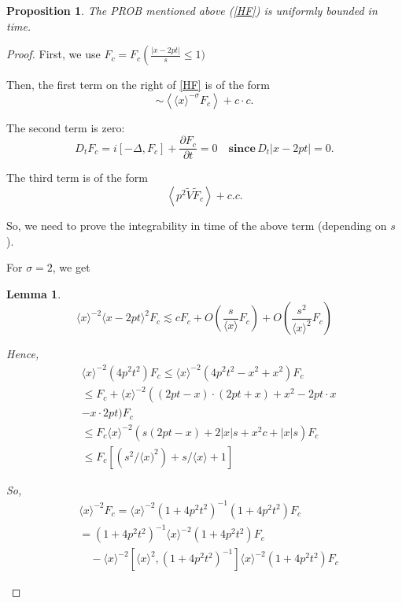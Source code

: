 \documentclass[11pt]{article}
\newtheorem{proposition}[theorem]{Proposition}
\newtheorem{lemma}[theorem]{Lemma}
\begin{document}
\begin{proposition}
 The PROB mentioned above (\eqref{HF}) is uniformly bounded in time.
\end{proposition}



\begin{proof}
First, we use $F_{c}=F_{c}\left(\frac{|x-2 p t|}{s} \leq 1\right.)$


Then, the first term on the right of \eqref{HF} is of the form
$$
\sim\left\langle\langle x\rangle^{-\sigma} F_{c}\right\rangle+c \cdot c .
$$

The second term is zero:
$$
D_t F_{c}=i\left[-\Delta, F_{c}\right]+\frac{\partial F_{c}}{\partial t}=0 \quad \textbf{since} \, D_t|x-2pt|=0.
$$

The third term is of the form
$$
\left\langle p^{2} \tilde{V} \tilde{F}_{c}\right\rangle+c.c.
$$

So, we need to prove the integrability in time of the above term (depending on $s$ ).

For $\sigma=2$, we get

\begin{lemma}
    

$$
\langle x\rangle^{-2}\langle x-2 p t\rangle^{2} F_{c} \lesssim c F_{c}+O\left(\frac{s}{\langle x\rangle} F_{c}\right)+O\left(\frac{s^{2}}{\langle x\rangle^{2}} F_{c}\right)
$$

Hence,
$$
\begin{aligned}
&\langle x\rangle^{-2}\left(4 p^{2} t^{2}\right) F_{c} \leq\langle x\rangle^{-2}\left(4 p^{2} t^{2}-x^{2}+x^{2}\right) F_{c} \\
& \leq F_{c}+\langle x\rangle^{-2}\left((2 p t-x) \cdot(2 p t+x)+x^{2}-2 p t \cdot x\right. \\
&-x \cdot 2 p t) F_{c} \\
& \leq F_{c}\langle x\rangle^{-2}\left(s(2 p t-x)+2|x| s+x^{2} c+|x| s\right) F_{c} \\
& \leq F_{c}\left[\left(s^{2} /\langle x)^{2}\right)+s /\langle x\rangle+1\right]
\end{aligned}
$$

So,
$$
\begin{aligned}
& \langle x\rangle^{-2} F_{c}=\langle x\rangle^{-2}\left(1+4 p^{2} t^{2}\right)^{-1}\left(1+4 p^{2} t^{2}\right) F_{c} \\
& =\left(1+4 p^{2} t^{2}\right)^{-1}\langle x\rangle^{-2}\left(1+4 p^{2} t^{2}\right) F_{c} \\
& \quad-\langle x\rangle^{-2}\left[\langle x\rangle^{2},\left(1+4 p^{2} t^{2}\right)^{-1}\right]\langle x\rangle^{-2}\left(1+4 p^{2} t^{2}\right) F_{c}
\end{aligned}
$$


\end{lemma}
\end{proof}
\end{document}
